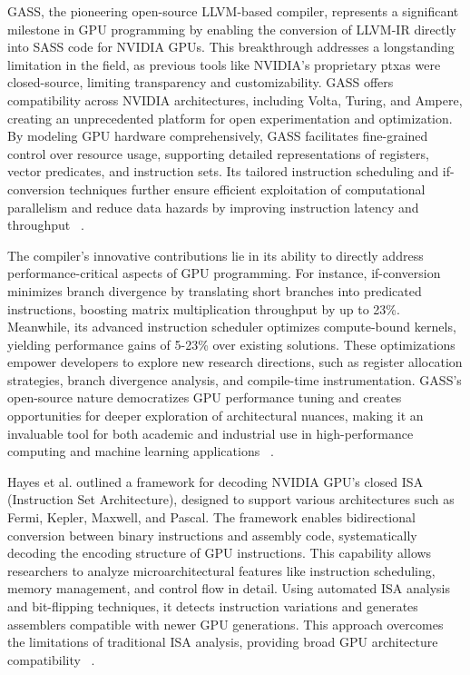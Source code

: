 \documentclass[conference]{IEEEtran}
\begin{document}
GASS, the pioneering open-source LLVM-based compiler, represents a significant milestone in GPU programming by enabling the conversion of LLVM-IR directly into SASS code for NVIDIA GPUs. This breakthrough addresses a longstanding limitation in the field, as previous tools like NVIDIA's proprietary ptxas were closed-source, limiting transparency and customizability. GASS offers compatibility across NVIDIA architectures, including Volta, Turing, and Ampere, creating an unprecedented platform for open experimentation and optimization. By modeling GPU hardware comprehensively, GASS facilitates fine-grained control over resource usage, supporting detailed representations of registers, vector predicates, and instruction sets. Its tailored instruction scheduling and if-conversion techniques further ensure efficient exploitation of computational parallelism and reduce data hazards by improving instruction latency and throughput ~\cite{Yan2022}.

The compiler's innovative contributions lie in its ability to directly address performance-critical aspects of GPU programming. For instance, if-conversion minimizes branch divergence by translating short branches into predicated instructions, boosting matrix multiplication throughput by up to 23\%. Meanwhile, its advanced instruction scheduler optimizes compute-bound kernels, yielding performance gains of 5-23\% over existing solutions. These optimizations empower developers to explore new research directions, such as register allocation strategies, branch divergence analysis, and compile-time instrumentation. GASS’s open-source nature democratizes GPU performance tuning and creates opportunities for deeper exploration of architectural nuances, making it an invaluable tool for both academic and industrial use in high-performance computing and machine learning applications ~\cite{Yan2022}.

Hayes et al. outlined a framework for decoding NVIDIA GPU's closed ISA (Instruction Set Architecture), designed to support various architectures such as Fermi, Kepler, Maxwell, and Pascal. The framework enables bidirectional conversion between binary instructions and assembly code, systematically decoding the encoding structure of GPU instructions. This capability allows researchers to analyze microarchitectural features like instruction scheduling, memory management, and control flow in detail. Using automated ISA analysis and bit-flipping techniques, it detects instruction variations and generates assemblers compatible with newer GPU generations. This approach overcomes the limitations of traditional ISA analysis, providing broad GPU architecture compatibility ~\cite{Hayes2019}.
\end{document}
